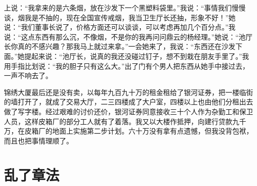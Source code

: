 \documentclass[12pt,oneside]{book}
\begin{document}
上说：``我拿来的是六条烟，放在沙发下一个黑塑料袋里。''我说：``事情我们慢慢谈，烟我是不抽的，现在全国宣传戒烟，我当卫生厅长还抽，形象不好！''她说：``我们董事长说了，价格方面还可以谈谈，可以考虑再加几个百分点。''我说：``这点东西有那么沉，不像烟，不是你的我再问问鼎云的杨经理。''她说：``池厅长你真的不感兴趣？那我马上就过来拿。''一会她来了，我说：``东西还在沙发下面。''她提起来说：``池厅长，说真的我还没碰过钉子，想不到栽在朋友手里了。''我用手指比划说：``我的胆子只有这么大。''出了门有个男人把东西从她手中接过去，一声不响去了。

锦绣大厦最后还是没有卖，以每年九百九十万的租金租给了银河证券，把一楼临街的墙打开了，就成了交易大厅，二三四楼成了大户室，四楼以上也由他们分租出去做了写字楼。经过艰难的讨价还价，银河证券同意接收三十个人作为杂勤工和保卫人员，这样皮箱厂的部分工人就有了着落。我又以大楼作抵押，向建行贷款九千万，在皮箱厂的地面上实施第二步计划。六十万没有拿有点遗憾，但我没背包袱，而且也把事情理顺了。


\chapter{乱了章法}
\end{document}
